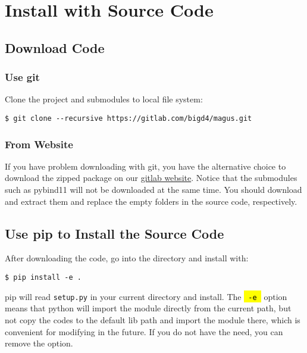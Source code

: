 \documentclass[12pt,oneside]{book}
\newcommand{\code}[1]{
  \begingroup
  \sethlcolor{Seashell}
  {\hl{\texttt{~#1~}}}
  \endgroup
}
\newcommand{\file}[1]{\texttt{#1}}
\begin{document}
\section{Install with Source Code}
\subsection{Download Code}
\subsubsection{Use git}
Clone the project and submodules to local file system:
\begin{tcolorbox}
    \begin{verbatim}
$ git clone --recursive https://gitlab.com/bigd4/magus.git
    \end{verbatim}
\end{tcolorbox}
\subsubsection{From Website}
If you have problem downloading with git, you have the alternative choice to download the zipped package on our \textcolor{blue}{\href{https://gitlab.com/bigd4/magus}{gitlab website}}. Notice that the submodules such as pybind11 will not be downloaded at the same time. You should download and extract them and replace the empty folders in the source code, respectively.

\subsection{Use pip to Install the Source Code}
After downloading the code, go into the directory and install with:
\begin{tcolorbox}
    \begin{verbatim}
$ pip install -e .
    \end{verbatim}
\end{tcolorbox}
pip will read \file{setup.py} in your current directory and install. The \code{-e} option means that python will import the module directly from the current path, but not copy the codes to the default lib path and import the module there, which is convenient for modifying in the future. If you do not have the need, you can remove the option.
\end{document}
